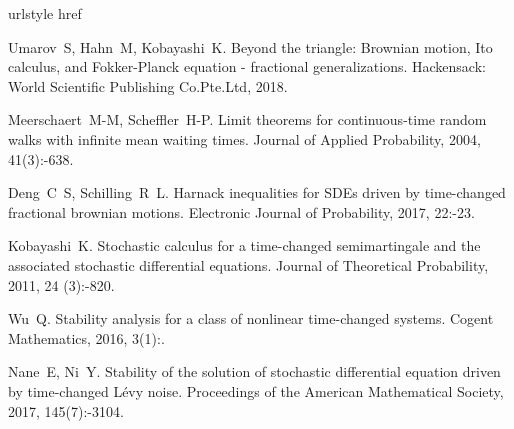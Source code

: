 

\begin{thebibliography}{99}

    \providecommand{\natexlab}[1]{#1}
    \providecommand{\url}[1]{#1}
    \expandafter\ifx\csname urlstyle\endcsname\relax\else
    \fi
    \expandafter\ifx\csname href\endcsname\relax
    \DeclareUrlCommand{}
    \def\eprint#1#2{#2}
    \else
    \def\doi#1{\href{https://doi.org/#1}{\nolinkurl{#1}}}
    \let\eprint\href
    \fi
    
    Umarov~S, Hahn~M, Kobayashi~K.
    \newblock Beyond the triangle: Brownian motion, {Ito} calculus, and
    {Fokker-Planck} equation - fractional generalizations\allowbreak[M].
    \newblock Hackensack: World Scientific Publishing Co.Pte.Ltd, 2018.
    
    Meerschaert~M-M, Scheffler~H-P.
    \newblock Limit theorems for continuous-time random walks with infinite mean
    waiting times\allowbreak[J].
    \newblock Journal of Applied Probability, 2004, 41\allowbreak (3):-638.
    
    Deng~C~S, Schilling~R~L.
    \newblock Harnack inequalities for {SDEs} driven by time-changed fractional
    brownian motions\allowbreak[J].
    \newblock Electronic Journal of Probability, 2017, 22:-23.
    
    Kobayashi~K.
    \newblock Stochastic calculus for a time-changed semimartingale and the
    associated stochastic differential equations\allowbreak[J].
    \newblock Journal of Theoretical Probability, 2011, 24\allowbreak
    (3):-820.
    
    Wu~Q.
    \newblock Stability analysis for a class of nonlinear time-changed
    systems\allowbreak[J].
    \newblock Cogent Mathematics, 2016, 3\allowbreak (1):.
    
    Nane~E, Ni~Y.
    \newblock Stability of the solution of stochastic differential equation driven
    by time-changed {Lévy} noise\allowbreak[J].
    \newblock Proceedings of the American Mathematical Society, 2017,
    145\allowbreak (7):-3104.
    

\end{thebibliography}

